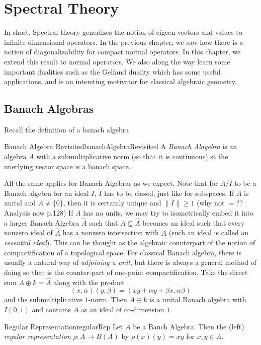 \documentclass[oneside]{book}
\newcommand{\sse}{\subseteq}
\begin{document}
\chapter{Spectral Theory}\label{cha:specTheory}

In short, Spectral theory generlizes the notion of eigeen vectors and values to infinite dimensional operators.
In the previous chapter, we saw how there is a notion of diagonalizability for compact normal operators. In this
chapter, we extend this result to normal operators. We also along the way learn some important dualities such as
the Gelfand duality which has some useful applications, and is an intersting motivator for classical algebraic
geometry.


\section{Banach Algebras}

Recall the definition of a banach algebra

\begin{defn}{Banach Algebra Revisited}{banachAlgebraRevisited}
	A \emph{Banach Alagebra} is an algebra $A$ with a submultiplicative norm (so that it is continuous)
	st the unerlying vector space is a banach space.
\end{defn}

All the same applies for Banach Algebras as we expect. Note that for $A/I$ to be a Banach algebra for an ideal $I$, $I$
has to be closed, just like for subspaces. If $A$ is unital and $A \ne \{0\}$, then it is certainly unique and
$\|I\|\ge 1$ (why not $=$?? Analysis now p.128) If $A$ has no units, we may try to isometrically embed it into
a larger Banach Algebra $\widehat{A}$ such that $A \sse \widehat{A}$ becomes an ideal such that every nonzero
ideal of $\widehat{A}$ has a nonzero intersection with $A$ (such an ideal is called an \emph{essential ideal}). This can
be thought as the algebraic counterpart of the notion of compactification of a topological space. For classical
Banach algebra, there is usually a natural way of \emph{adjoining a unit}, but there is always a general
method of doing so that is the counter-part of one-point compactification. Take the direct sum $A\oplus
k = \widehat{A}$ along with the product
\[
	(x, \alpha)(y, \beta) = (xy + \alpha y + \beta x, \alpha\beta)
\]
and the submultiplicative $1$-norm. Then $A\oplus k$ is a unital Banach algebra with $I(0,1)$ and contains $A$ as an
ideal of co-dimension $1$.

\begin{defn}{Regular Representation}{regularRep}
	Let $A$ be a Banch Algebra. Then the (left) \emph{regular representation} $\rho: A \to B(A)$ by $\rho(x)(y)
	= xy$ for $x,y \in A$.
\end{defn}
\end{document}
